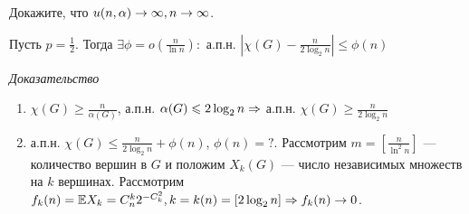 \begin{exercise}
    Докажите, что \(u(n, \alpha) \rightarrow \infty, n \rightarrow \infty\).
\end{exercise}

\begin{theorem}[Боллобаш]
    Пусть \(p = \frac{1}{2}\). Тогда \(\exists \phi = o\left( \frac{n}{\ln n} \right):\) а.п.н. \(\left| \chi(G) - \frac{n}{2\log_2 n} \right| \le \phi(n)\)
\end{theorem}
\noindent\textit{Доказательство} 
\begin{enumerate}
    \item \(\chi(G) \ge \frac{n}{\alpha(G)}\), а.п.н. \(\alpha(G) \leqslant 2\log_2 n \Rightarrow\) а.п.н. \(\chi(G) \ge \frac{n}{2\log_2 n}\)
    \item а.п.н. \(\chi(G) \le \frac{n}{2\log_2 n} + \phi(n)\), \(\phi(n) = ?\). Рассмотрим \(m = \left[ \frac{n}{\ln^2n} \right]\) --- количество вершин в \(G\) и положим \(X_k(G)\) --- число независимых множеств на \(k\) вершинах. Рассмотрим \(f_k(n) = \mathbb{E} X_k = C_n^k 2^{-C_k^2}, k = k(n) = [2\log_2n] \Rightarrow f_k(n) \rightarrow 0\).
\end{enumerate}
